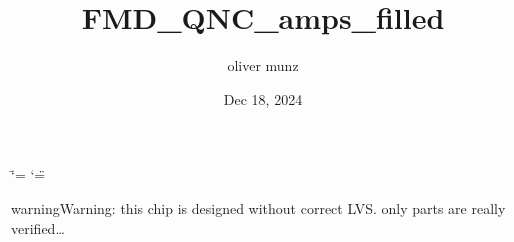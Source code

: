 \documentclass[letterpaper,10pt,english]{sphinxmanual}
\title{FMD\_QNC\_amps\_filled}
\date{Dec 18, 2024}
\author{oliver munz}
\begin{document}
\ifdefined\shorthandoff
  \ifnum\catcode`\=\string=\active\shorthandoff{=}\fi
  \ifnum\catcode`\"=\active{}\fi
\fi

\pagestyle{empty}
\sphinxmaketitle
\pagestyle{plain}
\sphinxtableofcontents
\pagestyle{normal}
\label{\detokenize{index::doc}}


\begin{sphinxadmonition}{warning}{Warning:}
\sphinxAtStartPar
this chip is designed without correct LVS. only parts are really verified…
\end{sphinxadmonition}


\sphinxAtStartPar


\sphinxstepscope
\end{document}
